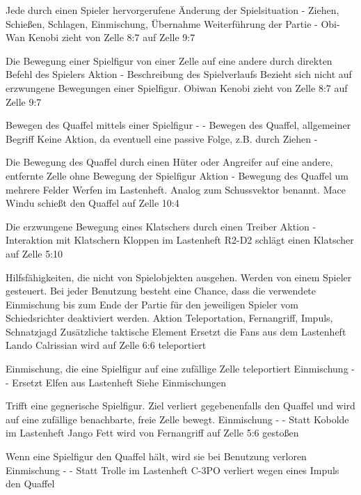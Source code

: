 {Jede durch einen Spieler hervorgerufene Änderung der Spielsituation}
{-}
{Ziehen, Schießen, Schlagen, Einmischung, Übernahme}
{Weiterführung der Partie}
{-}
{Obi-Wan Kenobi zieht von Zelle 8:7 auf Zelle 9:7}

{Die Bewegung einer Spielfigur von einer Zelle auf eine andere durch direkten Befehl des Spielers}
{Aktion}
{-}
{Beschreibung des Spielverlaufs}
{Bezieht sich nicht auf erzwungene Bewegungen einer Spielfigur.}
{Obiwan Kenobi zieht von Zelle 8:7 auf Zelle 9:7}

{Bewegen des Quaffel mittels einer Spielfigur}
{-}
{-}
{Bewegen des Quaffel, allgemeiner Begriff}
{Keine Aktion, da eventuell eine passive Folge, z.B. durch Ziehen}
{-}

{Die Bewegung des Quaffel durch einen Hüter oder Angreifer auf eine andere, entfernte Zelle ohne Bewegung der Spielfigur}
{Aktion}
{-}
{Bewegung des Quaffel um mehrere Felder}
{\glqq{}Werfen\grqq{}  im Lastenheft. Analog zum Schussvektor benannt.}
{Mace Windu schießt den Quaffel auf Zelle 10:4}

{Die erzwungene Bewegung eines Klatschers durch einen Treiber}
{Aktion}
{-}
{Interaktion mit Klatschern}
{\glqq{}Kloppen\grqq{}  im Lastenheft}
{R2-D2 schlägt einen Klatscher auf Zelle 5:10}

{Hilfsfähigkeiten, die nicht von Spielobjekten ausgehen. Werden von einem Spieler gesteuert. Bei jeder Benutzung besteht eine Chance, dass die verwendete Einmischung bis zum Ende der Partie für den jeweiligen Spieler vom Schiedsrichter deaktiviert werden.}
{Aktion}
{Teleportation, Fernangriff, Impuls, Schnatzjagd}
{Zusätzliche taktische Element}
{Ersetzt die \glqq{}Fans\grqq{}  aus dem Lastenheft}
{Lando Calrissian wird auf Zelle 6:6 teleportiert}

{Einmischung, die eine Spielfigur auf eine zufällige Zelle teleportiert}
{Einmischung}
{-}
{-}
{Ersetzt \glqq{}Elfen\grqq{}  aus Lastenheft}
{Siehe \glqq{}Einmischungen\grqq{} }

{Trifft eine gegnerische Spielfigur. Ziel verliert gegebenenfalls den Quaffel und wird auf eine zufällige benachbarte, freie Zelle bewegt.}
{Einmischung}
{-}
{-}
{Statt \glqq{}Kobolde\grqq{}  im Lastenheft}
{Jango Fett wird von Fernangriff auf Zelle 5:6 gestoßen}

{Wenn eine Spielfigur den Quaffel hält, wird sie bei Benutzung verloren}
{Einmischung}
{-}
{-}
{Statt \glqq{}Trolle\grqq{}  im Lastenheft}
{C-3PO verliert wegen eines Impuls den Quaffel}

